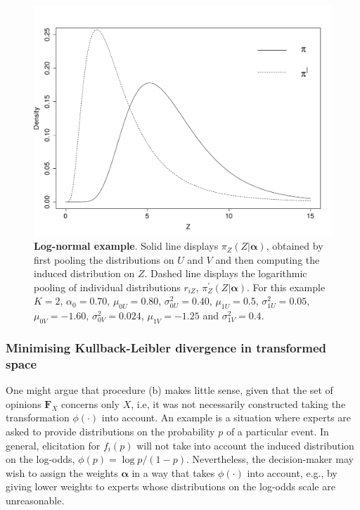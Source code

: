 \documentclass[a4paper, notitlepage, 10pt]{article}
\begin{document}
\begin{figure}[!ht]
\centering
\includegraphics[scale=0.5]{figures/lognormal_example.pdf}
\caption{\textbf{Log-normal example}. Solid line displays $\pi_Z(Z | \boldsymbol\alpha)$, obtained by first pooling the distributions on $U$ and $V$ and then computing the induced distribution on $Z$.
Dashed line displays the logarithmic pooling of individual distributions $r_{iZ}$, $\pi_Z^{\prime}(Z | \boldsymbol\alpha)$.
For this example $K=2$, $\alpha_0 = 0.70$, $\mu_{0U} = 0.80$, $\sigma_{0U}^2 = 0.40$, $\mu_{1U} = 0.5$, $\sigma_{1U}^2 = 0.05$, $\mu_{0V} = -1.60$, $\sigma_{0V}^2 = 0.024$, $\mu_{1V} = -1.25$ and  $\sigma_{1V}^2 = 0.4$.
}
\label{fig:lognormal_example}
\end{figure}


\subsubsection*{Minimising Kullback-Leibler divergence in transformed space}

One might argue that procedure (b) makes little sense, given that the set of opinions $\mathbf{F}_{X}$ concerns only $X$, i.e, it was not necessarily constructed taking the transformation $\phi(\cdot)$ into account.
An example is a situation where experts are asked to provide distributions on the probability $p$ of a particular event.
In general, elicitation for $f_i(p)$ will not take into account the induced distribution on the log-odds, $\phi(p) = \log p/(1-p)$.
Nevertheless, the decision-maker may wish to assign the weights $\boldsymbol\alpha$ in a way that takes $\phi(\cdot)$ into account, e.g., by giving lower weights to experts whose distributions on the log-odds scale are unreasonable.
\end{document}

